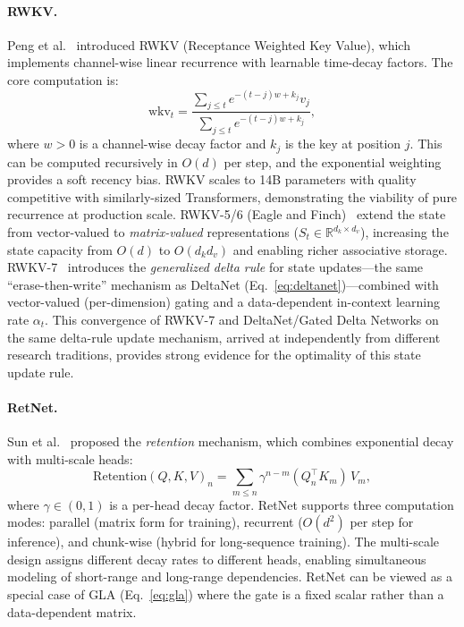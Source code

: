 \paragraph{RWKV.}
Peng et al.~\cite{peng2023rwkv} introduced RWKV (Receptance Weighted Key Value), which implements channel-wise linear recurrence with learnable time-decay factors. The core computation is:
\begin{equation}
\text{wkv}_t = \frac{\sum_{j \leq t} e^{-(t-j)w + k_j} v_j}{\sum_{j \leq t} e^{-(t-j)w + k_j}},
\label{eq:rwkv}
\end{equation}
where $w > 0$ is a channel-wise decay factor and $k_j$ is the key at position $j$. This can be computed recursively in $O(d)$ per step, and the exponential weighting provides a soft recency bias. RWKV scales to 14B parameters with quality competitive with similarly-sized Transformers, demonstrating the viability of pure recurrence at production scale. RWKV-5/6 (Eagle and Finch)~\cite{peng2024eagle} extend the state from vector-valued to \emph{matrix-valued} representations ($S_t \in \mathbb{R}^{d_k \times d_v}$), increasing the state capacity from $O(d)$ to $O(d_k d_v)$ and enabling richer associative storage. RWKV-7~\cite{peng2025rwkv7} introduces the \emph{generalized delta rule} for state updates---the same ``erase-then-write'' mechanism as DeltaNet (Eq.~\ref{eq:deltanet})---combined with vector-valued (per-dimension) gating and a data-dependent in-context learning rate $\alpha_t$. This convergence of RWKV-7 and DeltaNet/Gated Delta Networks on the same delta-rule update mechanism, arrived at independently from different research traditions, provides strong evidence for the optimality of this state update rule.

\paragraph{RetNet.}
Sun et al.~\cite{sun2023retentive} proposed the \emph{retention} mechanism, which combines exponential decay with multi-scale heads:
\begin{equation}
\text{Retention}(Q, K, V)_n = \sum_{m \leq n} \gamma^{n-m} (Q_n^\top K_m)\, V_m,
\label{eq:retnet}
\end{equation}
where $\gamma \in (0, 1)$ is a per-head decay factor. RetNet supports three computation modes: parallel (matrix form for training), recurrent ($O(d^2)$ per step for inference), and chunk-wise (hybrid for long-sequence training). The multi-scale design assigns different decay rates to different heads, enabling simultaneous modeling of short-range and long-range dependencies. RetNet can be viewed as a special case of GLA (Eq.~\ref{eq:gla}) where the gate is a fixed scalar rather than a data-dependent matrix.

